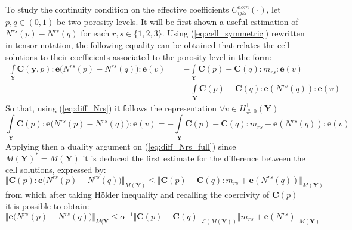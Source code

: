 To study the continuity condition on the effective coefficients $C^{hom}_{ijkl}(\cdot)$, let $\overline{p},\overline{q} \in (0,1)$ be two porosity levels. It will be first shown a useful estimation of $N^{rs}(p)-N^{rs}(q)$ for each $r,s \in \{1,2,3\}$. 
Using (\ref{eq:cell_symmetric}) rewritten in tensor notation, the following equality can be obtained that relates the cell solutions to their coefficients associated to the porosity level in the form:
\begin{equation}
    \label{eq:diff_Nrs}
    \begin{aligned}
        \int\limits_{\mathbf{Y}} \mathbf{C}(\mathbf{y},p):\mathbf{e}\big( N^{rs}(p)-N^{rs}(q) \big) : \mathbf{e}(v) & =  -\int\limits_{\mathbf{Y}} \mathbf{C}(p)-\mathbf{C}(q) : m_{rs}:\mathbf{e}(v) \\
        & \quad - \int\limits_{\mathbf{Y}}\mathbf{C}(p)-\mathbf{C}(q):\mathbf{e}(N^{rs}(q)):\mathbf{e}(v)
    \end{aligned}
\end{equation}
So that, using (\ref{eq:diff_Nrs}) it follows the representation $\forall v \in H^1_{\#,0}(\mathbf{Y})$
\begin{equation}
    \label{eq:diff_Nrs_full}
    \int\limits_{\mathbf{Y}} \mathbf{C}(p):\mathbf{e}\big(N^{rs}(p)-N^{rs}(q)\big):\mathbf{e}(v) = -\int\limits_{\mathbf{Y}} \mathbf{C}(p)-\mathbf{C}(q):m_{rs}+\mathbf{e}(N^{rs}(q)):\mathbf{e}(v)
\end{equation}
Applying then a duality argument on (\ref{eq:diff_Nrs_full}) since $M(\mathbf{Y})^* = M(\mathbf{Y})$ it is deduced the first estimate for the difference between the cell solutions, expressed by:
\begin{equation*}
    \Vert \mathbf{C}(p):\mathbf{e}\big(N^{rs}(p)-N^{rs}(q)\big) \Vert_{M(\mathbf{Y})} \leq \Vert \mathbf{C}(p)-\mathbf{C}(q):m_{rs}+\mathbf{e}(N^{rs}(q))\Vert_{M(\mathbf{Y})}
\end{equation*}
from which after taking H\"{o}lder inequality and recalling the coercivity of $\mathbf{C}(p)$ it is possible to obtain:
\begin{equation}
    \label{eq:ineq_diff_N}
    \Vert \mathbf{e}\big(N^{rs}(p)-N^{rs}(q)\big) \Vert_{M(\mathbf{Y}} \leq \alpha^{-1}\Vert \mathbf{C}(p)-\mathbf{C}(q) \Vert_{\mathcal{L}(M(\mathbf{Y}))} \Vert m_{rs}+\mathbf{e}(N^{rs}) \Vert_{M(\mathbf{Y})}
\end{equation}

